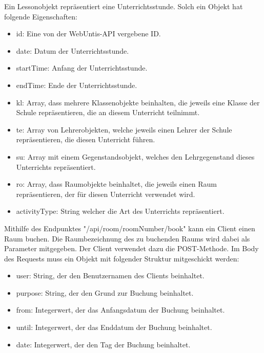 
Ein Lessonobjekt repräsentiert eine Unterrichtsstunde. Solch ein Objekt hat folgende Eigenschaften: 

\begin{itemize}
    \item id: Eine von der WebUntis-API vergebene ID.
    \item date: Datum der Unterrichtsstunde.
    \item startTime: Anfang der Unterrichtsstunde.
    \item endTime: Ende der Unterrichtsstunde.
    \item kl: Array, dass mehrere Klassenobjekte beinhalten, die jeweils eine Klasse der Schule repräsentieren, die an diesem Unterricht teilnimmt. 
    \item te: Array von Lehrerobjekten, welche jeweils einen Lehrer der Schule repräsentieren, die diesen Unterricht führen. 
    \item su: Array mit einem Gegenstandsobjekt, welches den Lehrgegenstand dieses Unterrichts repräsentiert.
    \item ro: Array, dass Raumobjekte beinhaltet, die jeweils einen Raum repräsentieren, der für diesen Unterricht verwendet wird. 
    \item activityType: String welcher die Art des Unterrichts repräsentiert. 
\end{itemize}


Mithilfe des Endpunktes "/api/room/{roomNumber}/book" kann ein Client einen Raum buchen. Die Raumbezeichnung des zu buchenden Raums wird dabei als Parameter mitgegeben. Der Client verwendet dazu die POST-Methode. Im Body des Requests muss ein Objekt mit folgender Struktur mitgeschickt werden: 

\begin{itemize}
    \item user: String, der den Benutzernamen des Clients beinhaltet. 
    \item purpose: String, der den Grund zur Buchung beinhaltet.
    \item from: Integerwert, der das Anfangsdatum der Buchung beinhaltet.
    \item until: Integerwert, der das Enddatum der Buchung beinhaltet.
    \item date: Integerwert, der den Tag der Buchung beinhaltet. 
\end{itemize}

